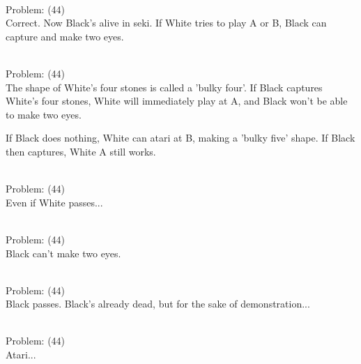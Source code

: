 \documentclass[11pt]{article}
\begin{document}
\begin{minipage}[t]{0.5\textwidth}
  {\centering
  
\\
Problem: (44)\\
Correct. Now Black's alive in seki. If White tries to play A or B, Black can capture and make two eyes.\\
  }
\end{minipage}
\begin{minipage}[t]{0.5\textwidth}
  {\centering
  
\\
Problem: (44)\\
The shape of White's four stones is called a 'bulky four'. If Black captures White's four stones, White will immediately play at A, and Black won't be able to make two eyes.

If Black does nothing, White can atari at B, making a 'bulky five' shape. If Black then captures, White A still works.\\
  }
\end{minipage}
\begin{minipage}[t]{0.5\textwidth}
  {\centering
  
\\
Problem: (44)\\
Even if White passes...\\
  }
\end{minipage}
\begin{minipage}[t]{0.5\textwidth}
  {\centering
  
\\
Problem: (44)\\
Black can't make two eyes.\\
  }
\end{minipage}
\begin{minipage}[t]{0.5\textwidth}
  {\centering
  
\\
Problem: (44)\\
Black passes. Black's already dead, but for the sake of demonstration...\\
  }
\end{minipage}
\begin{minipage}[t]{0.5\textwidth}
  {\centering
  
\\
Problem: (44)\\
Atari...\\
  }
\end{minipage}
\end{document}
